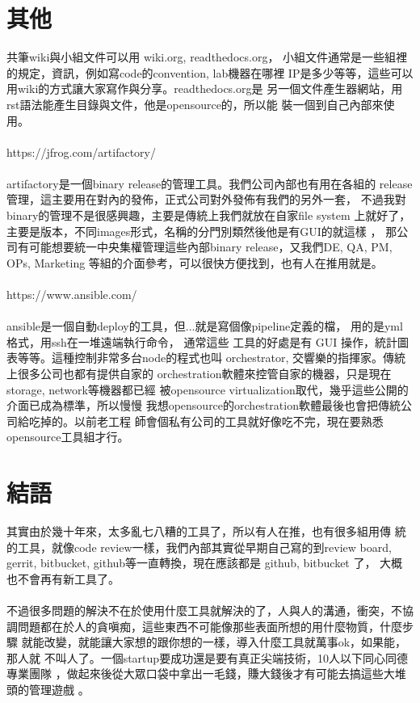 \section{其他}
  共筆wiki與小組文件可以用 wiki.org, readthedocs.org，
  小組文件通常是一些組裡的規定，資訊，例如寫code的convention, lab機器在哪裡
  IP是多少等等，這些可以用wiki的方式讓大家寫作與分享。readthedocs.org是
  另一個文件產生器網站，用rst語法能產生目錄與文件，他是opensource的，所以能
  裝一個到自己內部來使用。
  \\\\
  https://jfrog.com/artifactory/
  \\\\
  artifactory是一個binary release的管理工具。我們公司內部也有用在各組的
  release 管理，這主要用在對內的發佈，正式公司對外發佈有我們的另外一套，
  不過我對binary的管理不是很感興趣，主要是傳統上我們就放在自家file system 
  上就好了，主要是版本，不同images形式，名稱的分門別類然後他是有GUI的就這樣
  ， 那公司有可能想要統一中央集權管理這些內部binary release，又我們DE, QA, 
  PM, OPs, Marketing 等組的介面參考，可以很快方便找到，也有人在推用就是。
  \\\\
  https://www.ansible.com/
  \\\\
  ansible是一個自動deploy的工具，但...就是寫個像pipeline定義的檔，
  用的是yml格式，用ssh在一堆遠端執行命令， 通常這些
  工具的好處是有 GUI 操作，統計圖表等等。這種控制非常多台node的程式也叫
  orchestrator, 交響樂的指揮家。傳統上很多公司也都有提供自家的
  orchestration軟體來控管自家的機器，只是現在storage, network等機器都已經
  被opensource virtualization取代，幾乎這些公開的介面已成為標準，所以慢慢
  我想opensource的orchestration軟體最後也會把傳統公司給吃掉的。以前老工程
  師會個私有公司的工具就好像吃不完，現在要熟悉opensource工具組才行。
\section{結語}
  其實由於幾十年來，太多亂七八糟的工具了，所以有人在推，也有很多組用傳
  統的工具，就像code review一樣，我們內部其實從早期自己寫的到review board,
  gerrit, bitbucket, github等一直轉換，現在應該都是 github, bitbucket 了，
  大概也不會再有新工具了。
  \\\\
  不過很多問題的解決不在於使用什麼工具就解決的了，人與人的溝通，衝突，不協
  調問題都在於人的貪嗔痴，這些東西不可能像那些表面所想的用什麼物質，什麼步驟
  就能改變，就能讓大家想的跟你想的一樣，導入什麼工具就萬事ok，如果能，那人就
  不叫人了。一個startup要成功還是要有真正尖端技術，10人以下同心同德專業團隊
  ，做起來後從大眾口袋中拿出一毛錢，賺大錢後才有可能去搞這些大堆頭的管理遊戲
  。
